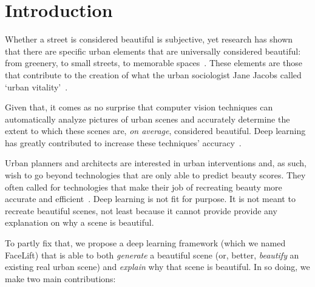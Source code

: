 \section{Introduction}


Whether a street is considered beautiful is subjective, yet research has shown that there are specific urban elements that are universally considered beautiful: from greenery, to small streets, to memorable spaces~\cite{alexander1977pattern, quercia2014aesthetic,salesses2013collaborative}. These elements are those that contribute to the creation of what the urban sociologist Jane Jacobs called `urban vitality'~\cite{jacobs1961death}. 


Given that, it comes as no surprise that computer vision techniques can automatically analyze pictures of urban scenes and accurately determine the extent to which these scenes are, \emph{on average}, considered beautiful.  Deep learning has greatly contributed to increase these techniques' accuracy~\cite{dubey2016deep}.

Urban planners and architects are interested in urban interventions and, as such, wish to go beyond technologies that are only able to predict beauty scores. They often called for technologies that make their job of  recreating beauty more accurate and efficient~\cite{de2008architecture}. Deep learning is not fit for purpose. It is not meant to recreate beautiful scenes, not least because it cannot provide provide any explanation on why a scene is beautiful. 

To partly fix that, we propose a deep learning framework (which we named  FaceLift) that is able to both \emph{generate} a beautiful scene (or, better, \emph{beautify} an existing real urban scene) and \emph{explain} why that scene is beautiful.  In so doing, we make two main contributions:

